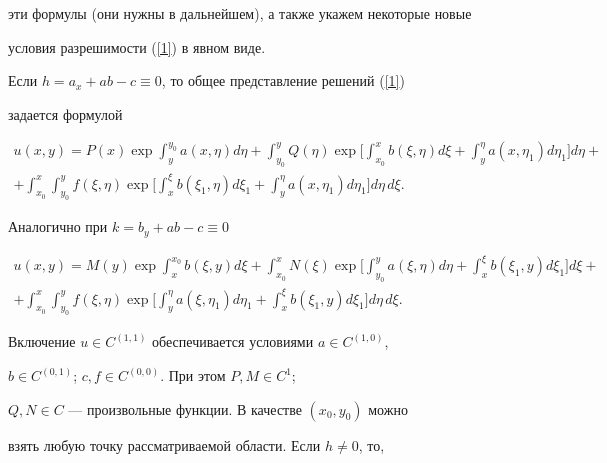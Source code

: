 эти формулы (они нужны в дальнейшем), а также укажем некоторые новые


условия разрешимости (\ref{1}) в явном виде.





Если $h=a_{x}+ab-c\equiv 0$, то общее представление решений (\ref{1})


задается формулой


\begin{multline}\label{2}


u(x,y)=P(x)\exp\int_{y}^{y_0} a(x,\eta)d\eta+


\int_{y_0}^{y} Q(\eta)\exp\biggl [\int_{x_0}^{x} b(\xi,\eta)d\xi+


\int_{y}^{\eta} a(x,\eta_1)d\eta_1\biggr]d\eta+\\


+\int_{x_0}^{x}\int_{y_0}^{y} f(\xi,\eta)\exp\biggl [


\int_{x}^{\xi} b(\xi_1,\eta)d\xi_1+\int_{y}^{\eta} a(x,\eta_1)d\eta_1


\biggr ] d\eta\,d\xi .


\end{multline}


Аналогично при $k=b_{y}+ab-c\equiv 0$


\begin{multline}\label{3}


u(x,y)=M(y)\exp\int_{x}^{x_0} b(\xi,y)d\xi+


\int_{x_0}^{x} N(\xi)\exp\biggl [\int_{y_0}^{y} a(\xi,\eta)d\eta+


\int_{x}^{\xi} b(\xi_1,y)d\xi_1\biggr]d\xi+\\


+\int_{x_0}^{x}\int_{y_0}^{y} f(\xi,\eta)\exp\biggl [


\int_{y}^{\eta} a(\xi,\eta_1)d\eta_1+\int_{x}^{\xi} b(\xi_1,y)d\xi_1


\biggr ] d\eta\, d\xi .


\end{multline}





Включение $u\in C^{(1,1)}$ обеспечивается условиями $a\in C^{(1,0)}$,


$b\in C^{(0,1)}$; $c, f\in C^{(0,0)}$. При этом $P, M\in C^1$;


$Q, N\in C$ --- произвольные функции. В качестве $(x_0,y_0)$ можно


взять любую точку рассматриваемой области. Если $h\ne0$, то,


